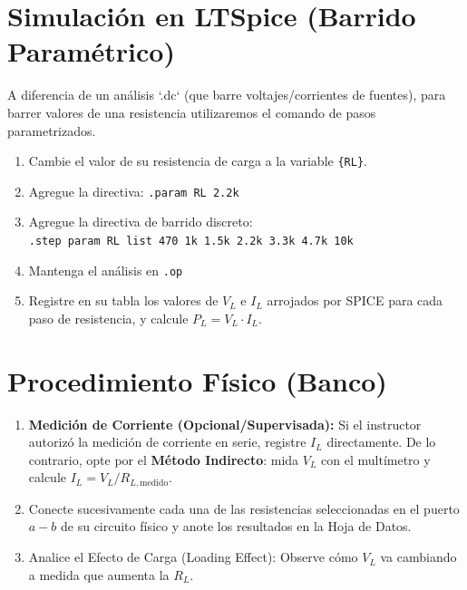 \documentclass[11pt, a4paper]{article}
\begin{document}
\section{Simulación en LTSpice (Barrido Paramétrico)}
A diferencia de un análisis `.dc` (que barre voltajes/corrientes de fuentes), para barrer valores de una resistencia utilizaremos el comando de pasos parametrizados. 
\begin{enumerate}
    \item Cambie el valor de su resistencia de carga a la variable \texttt{\{RL\}}.
    \item Agregue la directiva: \texttt{.param RL 2.2k}
    \item Agregue la directiva de barrido discreto: \\
    \texttt{.step param RL list 470 1k 1.5k 2.2k 3.3k 4.7k 10k}
    \item Mantenga el análisis en \texttt{.op}
    \item Registre en su tabla los valores de $V_L$ e $I_L$ arrojados por SPICE para cada paso de resistencia, y calcule $P_L = V_L \cdot I_L$.
\end{enumerate}

\section{Procedimiento Físico (Banco)}
\begin{enumerate}
    \item \textbf{Medición de Corriente (Opcional/Supervisada):} Si el instructor autorizó la medición de corriente en serie, registre $I_L$ directamente. De lo contrario, opte por el \textbf{Método Indirecto}: mida $V_L$ con el multímetro y calcule $I_L = V_L / R_{L,\text{medido}}$.
    \item Conecte sucesivamente cada una de las resistencias seleccionadas en el puerto $a-b$ de su circuito físico y anote los resultados en la Hoja de Datos.
    \item Analice el Efecto de Carga (Loading Effect): Observe cómo $V_L$ va cambiando a medida que aumenta la $R_L$.
\end{enumerate}
\end{document}
